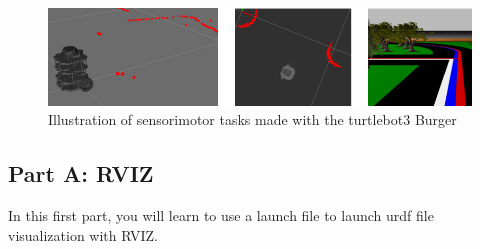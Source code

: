 \documentclass[10pt,a4paper]{upmc}
\newcommand{\subsecline}{\texorpdfstring{\hrulefill}{}}
\begin{document}
\begin{figure}[!h]
  \centering
  \includegraphics[width=\linewidth]{figures/tache_sensorimotrice.png}
  \caption{Illustration of sensorimotor tasks made with the turtlebot3 Burger}
  \label{fig:turtlebot_family}
\end{figure}

\subsection{Part A: RVIZ \subsecline}
\label{subsec:urdf}

In this first part, you will learn to use a launch file to launch urdf file visualization with RVIZ.
\end{document}
